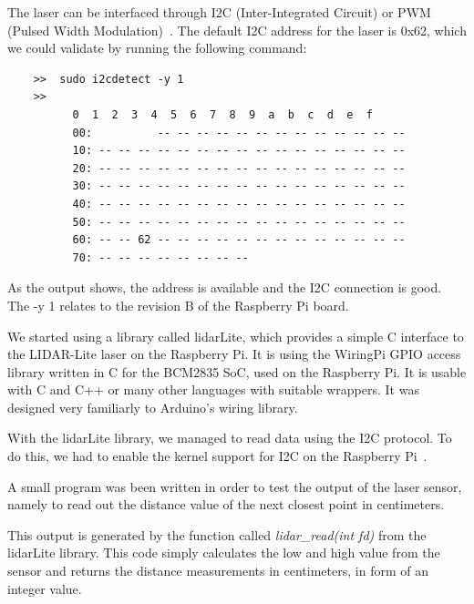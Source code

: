 The laser can be interfaced through I2C (Inter-Integrated Circuit) or PWM (Pulsed Width Modulation)~\cite{lidarsum}. The default I2C address for the laser is 0x62, which we could validate by running the following command:
\lstset{language=sh}
\begin{lstlisting}
	>>	sudo i2cdetect -y 1
	>>
		  0  1  2  3  4  5  6  7  8  9  a  b  c  d  e  f
		  00:          -- -- -- -- -- -- -- -- -- -- -- -- --
		  10: -- -- -- -- -- -- -- -- -- -- -- -- -- -- -- --
		  20: -- -- -- -- -- -- -- -- -- -- -- -- -- -- -- --
		  30: -- -- -- -- -- -- -- -- -- -- -- -- -- -- -- --
		  40: -- -- -- -- -- -- -- -- -- -- -- -- -- -- -- --
		  50: -- -- -- -- -- -- -- -- -- -- -- -- -- -- -- --
		  60: -- -- 62 -- -- -- -- -- -- -- -- -- -- -- -- --
		  70: -- -- -- -- -- -- -- -- 
\end{lstlisting}

As the output shows, the address is available and the I2C connection is good. The -y 1 relates to the revision B of the Raspberry Pi board.

We started using a library called lidarLite, which provides a simple C interface to the LIDAR-Lite laser on the Raspberry Pi. It is using the WiringPi GPIO access library written in C for the BCM2835 SoC, used on the Raspberry Pi. It is usable with C and C++ or many other languages with suitable wrappers. It was designed very familiarly to Arduino's wiring library.

With the lidarLite library\cite{lidarlib}, we managed to read data using the I2C protocol. To do this, we had to enable the kernel support for I2C on the Raspberry Pi~\cite{i2csetup}.

A small program was been written in order to test the output of the laser sensor, namely to read out the distance value of the next closest point in centimeters. 


This output is generated by the function called \textit{lidar\_read(int fd)} from the lidarLite library. This code simply calculates the low and high value from the sensor and returns the distance measurements in centimeters, in form of an integer value.



